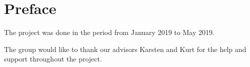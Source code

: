 \section{Preface}
The project was done in the period from January 2019 to May 2019.

The group would like to thank our advisors Karsten and Kurt for the help and support throughout the project. 
